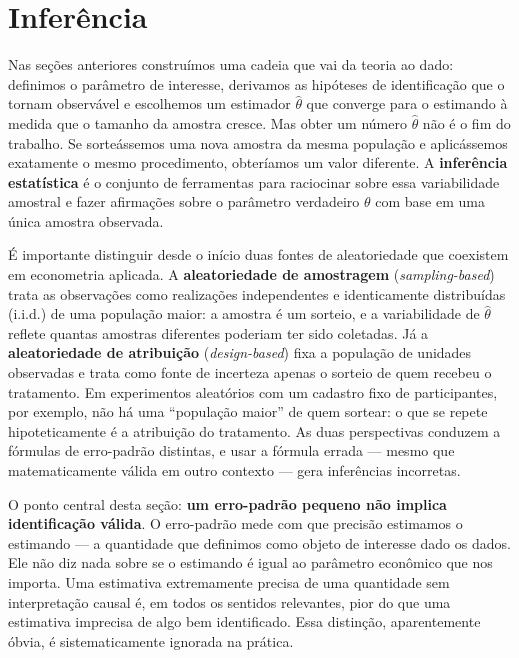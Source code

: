 
\chapter{Inferência}
\label{cap:inferencia}
\label{sec:inferencia}

Nas seções anteriores construímos uma cadeia que vai da teoria ao dado: definimos o parâmetro de interesse, derivamos as hipóteses de identificação que o tornam observável e escolhemos um estimador $\hat{\theta}$ que converge para o estimando à medida que o tamanho da amostra cresce. Mas obter um número $\hat{\theta}$ não é o fim do trabalho. Se sorteássemos uma nova amostra da mesma população e aplicássemos exatamente o mesmo procedimento, obteríamos um valor diferente. A \textbf{inferência estatística} é o conjunto de ferramentas para raciocinar sobre essa variabilidade amostral e fazer afirmações sobre o parâmetro verdadeiro $\theta$ com base em uma única amostra observada.

É importante distinguir desde o início duas fontes de aleatoriedade que coexistem em econometria aplicada. A \textbf{aleatoriedade de amostragem} (\textit{sampling-based}) trata as observações como realizações independentes e identicamente distribuídas (i.i.d.) de uma população maior: a amostra é um sorteio, e a variabilidade de $\hat{\theta}$ reflete quantas amostras diferentes poderiam ter sido coletadas. Já a \textbf{aleatoriedade de atribuição} (\textit{design-based}) fixa a população de unidades observadas e trata como fonte de incerteza apenas o sorteio de quem recebeu o tratamento. Em experimentos aleatórios com um cadastro fixo de participantes, por exemplo, não há uma ``população maior'' de quem sortear: o que se repete hipoteticamente é a atribuição do tratamento. As duas perspectivas conduzem a fórmulas de erro-padrão distintas, e usar a fórmula errada — mesmo que matematicamente válida em outro contexto — gera inferências incorretas.

O ponto central desta seção: \textbf{um erro-padrão pequeno não implica identificação válida}. O erro-padrão mede com que precisão estimamos o estimando — a quantidade que definimos como objeto de interesse dado os dados. Ele não diz nada sobre se o estimando é igual ao parâmetro econômico que nos importa. Uma estimativa extremamente precisa de uma quantidade sem interpretação causal é, em todos os sentidos relevantes, pior do que uma estimativa imprecisa de algo bem identificado. Essa distinção, aparentemente óbvia, é sistematicamente ignorada na prática.


